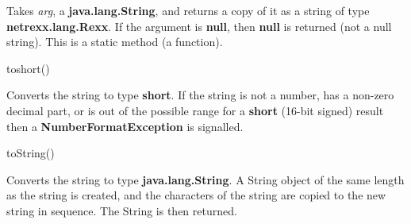 \begin{description}
 
Takes \emph{arg}, a \textbf{java.lang.String}, and returns a copy
of it as a string of type \textbf{netrexx.lang.Rexx}.
If the argument is \textbf{null}, then \textbf{null} is returned
(not a null string).
This is a static method (a function).
\item{toshort()}

Converts the string to type \textbf{short}.  If the string is
not a number, has a non-zero decimal part, or is out of the possible
range for a \textbf{short} (16-bit signed) result then
a \textbf{NumberFormatException} is signalled.
\item{toString()}

Converts the string to type \textbf{java.lang.String}.  A String
object of the same length as the string is created, and the characters
of the string are copied to the new string in sequence.  The String is
then returned.
\end{description}
